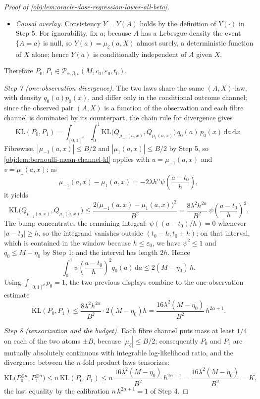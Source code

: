 \documentclass[11pt]{article}
\begin{document}
\begin{proof}[Proof of \cref{obj:lem:oracle-dose-regression-lower-all-beta}]
\begin{itemize}
\(p_0\) times Lebesgue measure on \([0,1]^d\); and the \((A,X)\)-law has Lebesgue density
\((a,x)\mapsto q_0(a)p_0(x)=\pi_{P_\zeta}(a\mid x)p_{X,P_\zeta}(x)\) on \([0,1]\times[0,1]^d\), which
is exactly the required factorization.
\item \emph{Causal overlay.} Consistency \(Y=Y(A)\) holds by the definition of \(Y(\cdot)\) in
Step 5. For ignorability, fix \(a\); because \(A\) has a Lebesgue density the event \(\{A=a\}\) is
null, so \(Y(a)=\mu_\zeta(a,X)\) almost surely, a deterministic function of \(X\) alone; hence
\(Y(a)\) is conditionally independent of \(A\) given \(X\).
\end{itemize}
Therefore \(P_0,P_1\in\mathcal P_{\alpha,\beta,s}(M,c_0,\varepsilon_0,t_0)\).

\emph{Step 7 (one-observation divergence).} The two laws share the same \((A,X)\)-law, with density
\(q_0(a)p_0(x)\), and differ only in the conditional outcome channel; since the observed pair
\((A,X)\) is a function of the observation and each fibre channel is dominated by its counterpart,
the chain rule for divergence gives
\[
\mathrm{KL}(P_0,P_1)
=
\int_{[0,1]^d}\!\!\int_0^1
\mathrm{KL}\bigl(Q_{\mu_{-1}(a,x)},Q_{\mu_{1}(a,x)}\bigr)\,
q_0(a)\,p_0(x)\,\mathrm da\,\mathrm dx .
\]
Fibrewise, \(|\mu_{-1}(a,x)|\le B/2\) and \(|\mu_1(a,x)|\le B/2\) by Step 5, so
\cref{obj:lem:bernoulli-mean-channel-kl} applies with \(u=\mu_{-1}(a,x)\) and \(v=\mu_1(a,x)\); as
\[
\mu_{-1}(a,x)-\mu_{1}(a,x)
=
-2\lambda h^{\alpha}\psi\!\left(\frac{a-t_0}{h}\right),
\]
it yields
\[
\mathrm{KL}\bigl(Q_{\mu_{-1}(a,x)},Q_{\mu_{1}(a,x)}\bigr)
\le
\frac{2\bigl(\mu_{-1}(a,x)-\mu_1(a,x)\bigr)^2}{B^2}
=
\frac{8\lambda^2h^{2\alpha}}{B^2}\,
\psi\!\left(\frac{a-t_0}{h}\right)^{2}.
\]
The bump concentrates the remaining integral: \(\psi((a-t_0)/h)=0\) whenever \(|a-t_0|\ge h\), so the
integrand vanishes outside \((t_0-h,t_0+h)\); on that interval, which is contained in the window
because \(h\le\varepsilon_0\), we have \(\psi^2\le 1\) and \(q_0\le M-\eta_0\) by Step 1; and the
interval has length \(2h\). Hence
\[
\int_0^1
\psi\!\left(\frac{a-t_0}{h}\right)^{2}q_0(a)\,\mathrm da
\le
2(M-\eta_0)\,h .
\]
Using \(\int_{[0,1]^d}p_0=1\), the two previous displays combine to the one-observation estimate
\[
\mathrm{KL}(P_0,P_1)
\le
\frac{8\lambda^2h^{2\alpha}}{B^2}\cdot 2(M-\eta_0)h
=
\frac{16\lambda^2(M-\eta_0)}{B^2}\,h^{2\alpha+1}.
\]

\emph{Step 8 (tensorization and the budget).} Each fibre channel puts mass at least \(1/4\) on each
of the two atoms \(\pm B\), because \(|\mu_\zeta|\le B/2\); consequently \(P_0\) and \(P_1\) are
mutually absolutely continuous with integrable log-likelihood ratio, and the divergence between the
\(n\)-fold product laws tensorizes:
\[
\mathrm{KL}\bigl(P_0^{\otimes n},P_1^{\otimes n}\bigr)
\le
n\,\mathrm{KL}(P_0,P_1)
\le
n\,\frac{16\lambda^2(M-\eta_0)}{B^2}\,h^{2\alpha+1}
=
\frac{16\lambda^2(M-\eta_0)}{B^2}
=
K,
\]
the last equality by the calibration \(n\,h^{2\alpha+1}=1\) of Step 4.


\end{proof}
\end{document}
